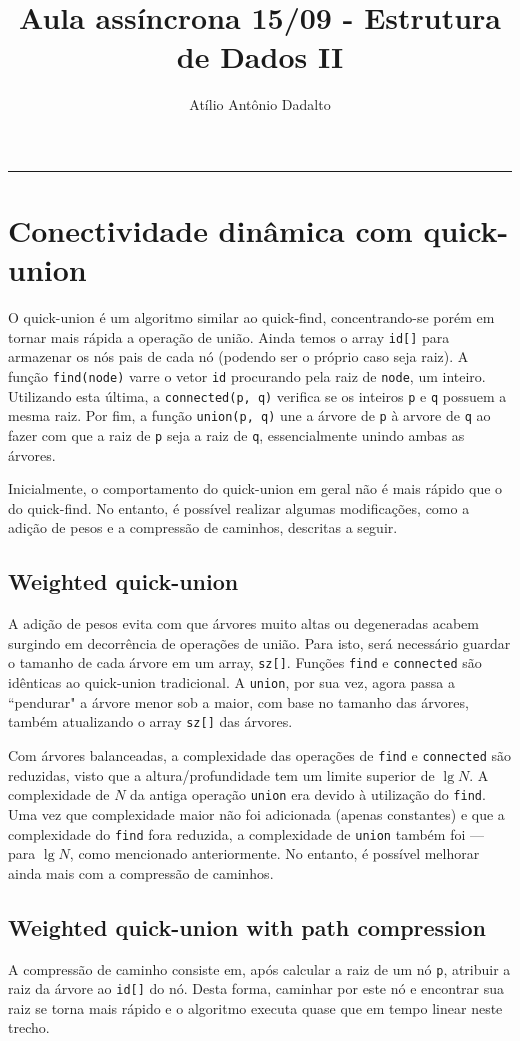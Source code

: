\documentclass[a4paper, 11pt, brazil]{article}
\begin{document}
    \vspace{-5ex}
	\title{Aula assíncrona 15/09 - Estrutura de Dados II}
	\author{Atílio Antônio Dadalto}
	\date{}
	\maketitle
		\hrule
	
\section*{Conectividade dinâmica com quick-union}
O quick-union é um algoritmo similar ao quick-find, concentrando-se porém em tornar mais rápida a operação de união. Ainda temos o array \texttt{id[]} para armazenar os nós pais de cada nó (podendo ser o próprio caso seja raiz). A função \texttt{find(node)} varre o vetor \texttt{id} procurando pela raiz de \texttt{node}, um inteiro. Utilizando esta última, a \texttt{connected(p, q)} verifica se os inteiros \texttt{p} e \texttt{q} possuem a mesma raiz. Por fim, a função \texttt{union(p, q)} une a árvore de \texttt{p} à arvore de \texttt{q} ao fazer com que a raiz de \texttt{p} seja a raiz de \texttt{q}, essencialmente unindo ambas as árvores.

Inicialmente, o comportamento do quick-union em geral não é mais rápido que o do quick-find. No entanto, é possível realizar algumas modificações, como a adição de pesos e a compressão de caminhos, descritas a seguir.

\subsection*{Weighted quick-union}
A adição de pesos evita com que árvores muito altas ou degeneradas acabem surgindo em decorrência de operações de união. Para isto, será necessário guardar o tamanho de cada árvore em um array, \texttt{sz[]}. Funções \texttt{find} e \texttt{connected} são idênticas ao quick-union tradicional. A \texttt{union}, por sua vez, agora passa a ``pendurar" a árvore menor sob a maior, com base no tamanho das árvores, também atualizando o array \texttt{sz[]} das árvores.

Com árvores balanceadas, a complexidade das operações de \texttt{find} e \texttt{connected} são reduzidas, visto que a altura/profundidade tem um limite superior de $\lg N$. A complexidade de $N$ da antiga operação \texttt{union} era devido à utilização do \texttt{find}. Uma vez que complexidade maior não foi adicionada (apenas constantes) e que a complexidade do \texttt{find} fora reduzida, a complexidade de \texttt{union} também foi --- para $\lg N$, como mencionado anteriormente. No entanto, é possível melhorar ainda mais com a compressão de caminhos.

\subsection*{Weighted quick-union with path compression}
A compressão de caminho consiste em, após calcular a raiz de um nó \texttt{p}, atribuir a raiz da árvore ao \texttt{id[]} do nó. Desta forma, caminhar por este nó e encontrar sua raiz se torna mais rápido e o algoritmo executa quase que em tempo linear neste trecho.
\end{document}
